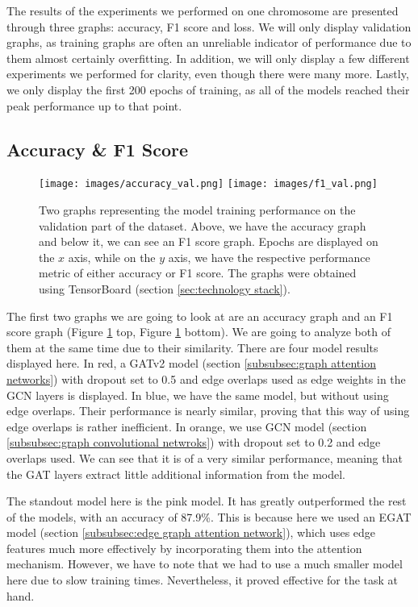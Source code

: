\documentclass[times, utf8, diplomski, english]{fer_eng}
\begin{document}
The results of the experiments we performed on one chromosome are presented through three graphs: accuracy, F1 score and loss. We will only display validation graphs, as training graphs are often an unreliable indicator of performance due to them almost certainly overfitting. In addition, we will only display a few different experiments we performed for clarity, even though there were many more. Lastly, we only display the first 200 epochs of training, as all of the models reached their peak performance up to that point.

\subsection{Accuracy \& F1 Score}

\begin{figure}[h]
	\centering
	\texttt{[image: images/accuracy\_val.png]}
	\texttt{[image: images/f1\_val.png]}
	\caption[Accuracy and f1 graph]{Two graphs representing the model training performance on the validation part of the dataset. Above, we have the accuracy graph and below it, we can see an F1 score graph. Epochs are displayed on the $x$ axis, while on the $y$ axis, we have the respective performance metric of either accuracy or F1 score. The graphs were obtained using TensorBoard (section \ref{sec:technology stack}).}
	\label{fig:accuracy and f1 graph}
\end{figure}

The first two graphs we are going to look at are an accuracy graph and an F1 score graph (Figure \ref{fig:accuracy and f1 graph} top, Figure \ref{fig:accuracy and f1 graph} bottom). We are going to analyze both of them at the same time due to their similarity. There are four model results displayed here. In red, a GATv2 model (section \ref{subsubsec:graph attention networks}) with dropout set to 0.5 and edge overlaps used as edge weights in the GCN layers is displayed. In blue, we have the same model, but without using edge overlaps. Their performance is nearly similar, proving that this way of using edge overlaps is rather inefficient. In orange, we use GCN model (section \ref{subsubsec:graph convolutional netwroks}) with dropout set to 0.2 and edge overlaps used. We can see that it is of a very similar performance, meaning that the GAT layers extract little additional information from the model.

The standout model here is the pink model. It has greatly outperformed the rest of the models, with an accuracy of 87.9\%. This is because here we used an EGAT model (section \ref{subsubsec:edge graph attention network}), which uses edge features much more effectively by incorporating them into the attention mechanism. However, we have to note that we had to use a much smaller model here due to slow training times. Nevertheless, it proved effective for the task at hand.
\end{document}
